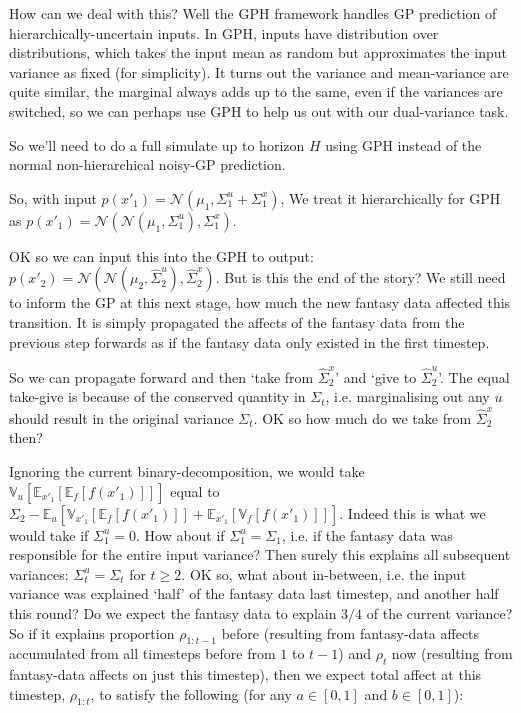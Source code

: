 \documentclass[a4paper,10pt]{article}
\newcommand{\N}{\mathcal{N}}
\newcommand{\E}{\mathbb{E}}
\newcommand{\V}{\mathbb{V}}
\begin{document}
\begin{itemize}
 How can we deal with this?
 Well the GPH framework handles GP prediction
 of hierarchically-uncertain inputs.
 In GPH, inputs have distribution over distributions,
 which takes the input mean as random but approximates the input variance as fixed (for simplicity).
 It turns out the variance and mean-variance are quite similar,
 the marginal always adds up to the same, even if the variances are switched,
 so we can perhaps use GPH to help us out with our dual-variance task.

 So we'll need to do a full simulate up to horizon $H$ using GPH
 instead of the normal non-hierarchical noisy-GP prediction.

 So, with input $p(x'_1)=\N(\mu_1,\Sigma^{u}_1 + \Sigma^{x}_1)$,
 We treat it hierarchically for GPH as $p(x'_1)=\N(\N(\mu_1,\Sigma^{u}_1),\Sigma^{x}_1)$.

 OK so we can input this into the GPH to output:
 $p(x'_2)=\N(\N(\mu_2,\hat{\Sigma}^{u}_2),\hat{\Sigma}^{x}_2)$.
 But is this the end of the story?
 We still need to inform the GP at this next stage,
 how much the new fantasy data affected this transition.
 It is simply propagated the affects of the fantasy data from the previous step forwards
 as if the fantasy data only existed in the first timestep.

 So we can propagate forward and then `take from $\hat{\Sigma}^{x}_2$'
 and `give to $\hat{\Sigma}^{u}_2$'.
 The equal take-give is because of the
 conserved quantity in $\Sigma_t$,
 i.e. marginalising out any $u$ should result in the original variance $\Sigma_t$.
 OK so how much do we take from $\hat{\Sigma}^{x}_2$ then?

 Ignoring the current binary-decomposition,
 we would take $\V_u[\E_{x'_1}[\E_f[f(x'_1)]]]$ equal to
 $\Sigma_2-\E_u[\V_{x'_1}[\E_f[f(x'_1)]] + \E_{x'_1}[\V_f[f(x'_1)]]]$.
 Indeed this is what we would take if $\Sigma^{u}_1=0$.
 How about if $\Sigma^{u}_1=\Sigma_1$, i.e. if the fantasy data
 was responsible for the entire input variance?
 Then surely this explains all subsequent variances: $\Sigma^{u}_t=\Sigma_t$ for $t\geq2$.
 OK so, what about in-between,
 i.e. the input variance was explained `half' of the fantasy data last timestep,
 and another half this round? Do we expect the fantasy data to explain $3/4$ of the current variance?
 So if it explains proportion $\rho_{1:t-1}$ before
 (resulting from fantasy-data affects accumulated from all timesteps before from $1$ to $t-1$)
 and $\rho_{t}$ now (resulting from fantasy-data affects on just this timestep),
 then we expect total affect at this timestep, $\rho_{1:t}$,
 to satisfy the following (for any $a\in[0,1]$ and $b\in[0,1]$):


\end{itemize}
\end{document}
